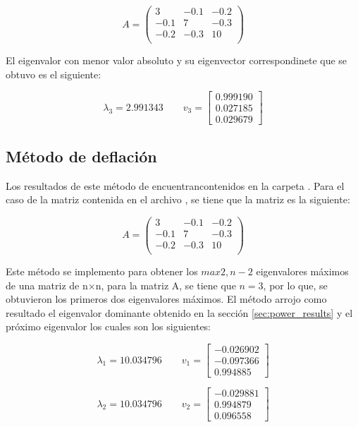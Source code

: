 \begin{equation*}
    A= \begin{pmatrix}
        3    & -0.1 & -0.2 \\
        -0.1 & 7    & -0.3 \\
        -0.2 & -0.3 & 10   \\
    \end{pmatrix}
\end{equation*}

El eigenvalor con menor valor absoluto y su eigenvector correspondinete que se obtuvo es el siguiente:

\begin{equation*}
    \lambda_3 = 2.991343 \qquad v_3 =
    \begin{bmatrix}
        0.999190 \\0.027185\\	0.029679
    \end{bmatrix}
\end{equation*}

\subsection{Método de deflación}

Los resultados de este método de encuentrancontenidos en la carpeta . Para el caso de la matriz contenida en el archivo , se tiene que la matriz es la siguiente:

\begin{equation*}
    A= \begin{pmatrix}
        3    & -0.1 & -0.2 \\
        -0.1 & 7    & -0.3 \\
        -0.2 & -0.3 & 10   \\
    \end{pmatrix}
\end{equation*}

Este método se implemento para obtener los $max{2,n-2}$ eigenvalores máximos de una matriz de n$ \times$n, para la matriz A, se tiene que $n=3$, por lo que, se obtuvieron los primeros dos eigenvalores máximos. El método arrojo como resultado el eigenvalor dominante obtenido en la sección \ref{sec:power_results} y el próximo eigenvalor los cuales son los siguientes:

\begin{equation*}
    \lambda_1 = 10.034796 \qquad v_1 =
    \begin{bmatrix}
        -0.026902 \\	-0.097366\\	0.994885
    \end{bmatrix}
\end{equation*}

\begin{equation*}
    \lambda_2 = 10.034796 \qquad v_2 =
    \begin{bmatrix}
        -0.029881 \\0.994879\\	0.096558
    \end{bmatrix}
\end{equation*}